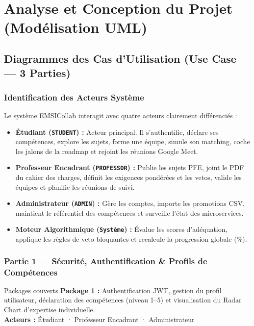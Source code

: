 \documentclass[11pt,a4paper,titlepage]{article}
\begin{document}
\section{Analyse et Conception du Projet (Modélisation UML)}

\subsection{Diagrammes des Cas d'Utilisation (Use Case — 3 Parties)}

\subsubsection{Identification des Acteurs Système}

Le système EMSICollab interagit avec quatre acteurs clairement différenciés :
\begin{itemize}[leftmargin=1.5cm]
    \item \textbf{Étudiant (\texttt{STUDENT}) :} Acteur principal. Il s'authentifie, déclare ses compétences, explore les sujets, forme une équipe, simule son matching, coche les jalons de la roadmap et rejoint les réunions Google Meet.
    \item \textbf{Professeur Encadrant (\texttt{PROFESSOR}) :} Publie les sujets PFE, joint le PDF du cahier des charges, définit les exigences pondérées et les vetos, valide les équipes et planifie les réunions de suivi.
    \item \textbf{Administrateur (\texttt{ADMIN}) :} Gère les comptes, importe les promotions CSV, maintient le référentiel des compétences et surveille l'état des microservices.
    \item \textbf{Moteur Algorithmique (\texttt{Système}) :} Évalue les scores d'adéquation, applique les règles de veto bloquantes et recalcule la progression globale (\%).
\end{itemize}

\newpage
\subsubsection{Partie 1 — Sécurité, Authentification \& Profils de Compétences}

\begin{calloutbox}{Packages couverts}
\textbf{Package 1 :} Authentification JWT, gestion du profil utilisateur, déclaration des compétences (niveau 1–5) et visualisation du Radar Chart d'expertise individuelle.\\[4pt]
\textbf{Acteurs :} Étudiant · Professeur Encadrant · Administrateur
\end{calloutbox}
\end{document}
